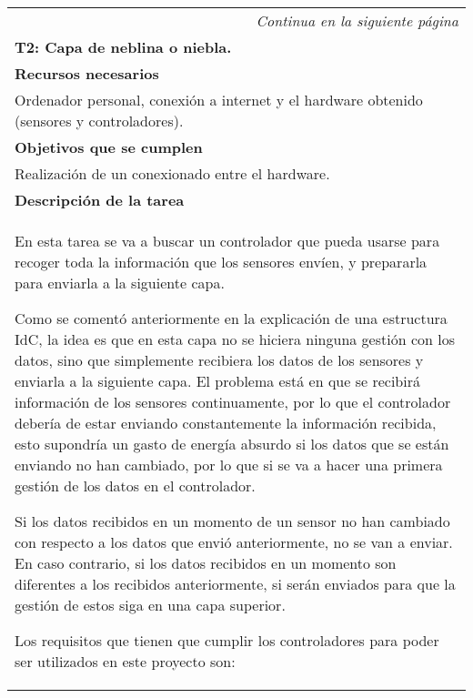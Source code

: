 \begin{longtable}{|p{}|}
\hline
\endfirsthead
\endhead
\hline \multicolumn{1}{r}{\textit{Continua en la siguiente página}} \\
\endfoot
\endlastfoot
    \rowcolor[gray]{.5}
    {\color{white}\textbf{T2: Capa de neblina o niebla.}} \\
    \hline
    \rowcolor[gray]{.9}
    \textbf{Recursos necesarios} \\
    \hline
    Ordenador personal, conexión a internet y el hardware obtenido (sensores y controladores). \\
    \hline
    \rowcolor[gray]{.9}
    \textbf{Objetivos que se cumplen} \\
    \hline
    Realización de un conexionado entre el hardware.\\
    \hline
    \rowcolor[gray]{.9}
    \textbf{Descripción de la tarea} \\
    \hline
    En esta tarea se va a buscar un controlador que pueda usarse para recoger toda la información que los sensores envíen, y prepararla para enviarla a la siguiente capa.

    Como se comentó anteriormente en la explicación de una estructura IdC, la idea es que en esta capa no se hiciera ninguna gestión con los datos, sino que simplemente recibiera los datos de los sensores y enviarla a la siguiente capa. El problema está en que se recibirá información de los sensores continuamente, por lo que el controlador debería de estar enviando constantemente la información recibida, esto supondría un gasto de energía absurdo si los datos que se están enviando no han cambiado, por lo que si se va a hacer una primera gestión de los datos en el controlador. 
    
    Si los datos recibidos en un momento de un sensor no han cambiado con respecto a los datos que envió anteriormente, no se van a enviar. En caso contrario, si los datos recibidos en un momento son diferentes a los recibidos anteriormente, si serán enviados para que la gestión de estos siga en una capa superior.
    
    Los requisitos que tienen que cumplir los controladores para poder ser utilizados en este proyecto son: 
    

\end{longtable}
